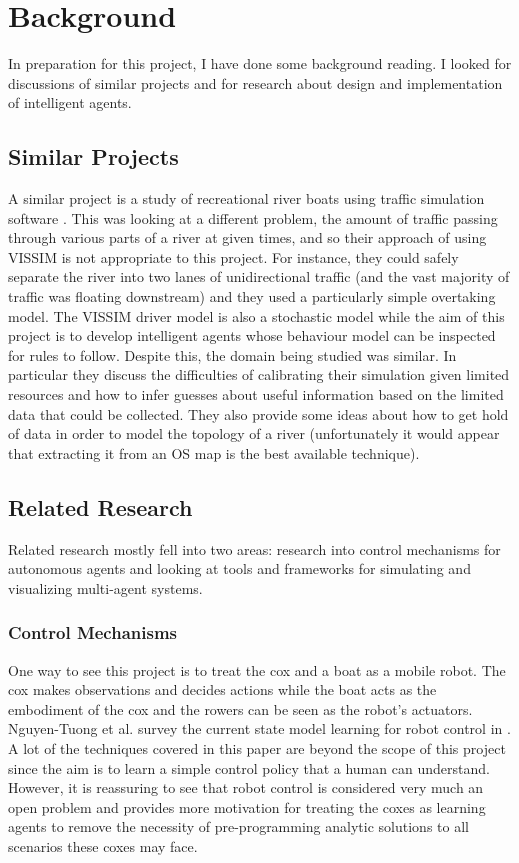 \chapter{Background}

In preparation for this project, I have done some background
reading. I looked for discussions of similar projects and for research about design and implementation of intelligent agents. 

\section{Similar Projects}

A similar project is a study of recreational river boats using
traffic simulation software \cite{Lowry2011}. This was looking at a
different problem, the amount of traffic passing through various parts
of a river at given times, and so their approach of using VISSIM is
not appropriate to this project. For instance, they could safely
separate the river into two lanes of unidirectional traffic (and the
vast majority of traffic was floating downstream) and they used a
particularly simple overtaking model. The VISSIM driver model is also
a stochastic model while the aim of this project is to develop
intelligent agents whose behaviour model can be inspected for rules to
follow. Despite this, the domain being studied was
similar. In particular they discuss the difficulties of calibrating
their simulation given limited resources and how to infer guesses
about useful information based on the limited data that could be
collected. They also provide some ideas about how to get hold of data
in order to model the topology of a river (unfortunately it would
appear that extracting it from an OS map is the best available
technique).

\section{Related Research}

Related research mostly fell into two areas: research into control mechanisms for
autonomous agents and looking at tools and frameworks for simulating
and visualizing multi-agent systems.

\subsection{Control Mechanisms}

One way to see this project is to treat the cox and a boat as a mobile
robot. The cox makes observations and decides actions while the boat
acts as the embodiment of the cox and the rowers can be
seen as the robot's actuators. Nguyen-Tuong et al. survey the current state
model learning for robot control in \cite{Nguyen-Tuong2011}. A lot of
the techniques covered in this paper are beyond the scope of
this project since the aim is to learn a simple control policy that a
human can understand. However, it is reassuring to see that robot
control is considered very much an open problem and provides
more motivation for treating the coxes as learning agents to remove the
necessity of pre-programming analytic solutions to all scenarios these
coxes may face.


